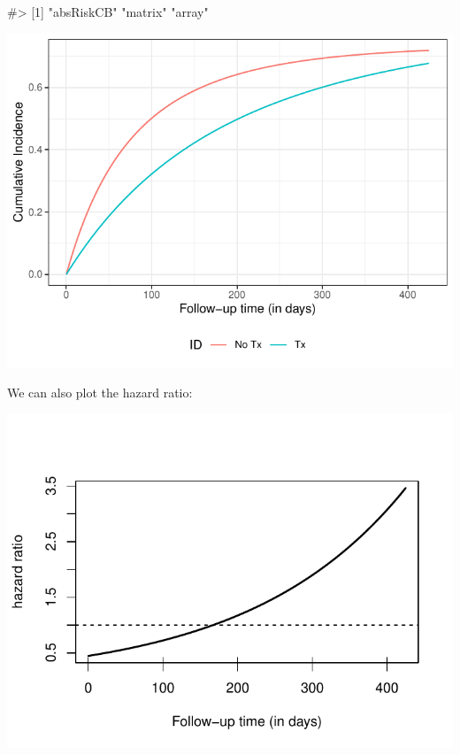\documentclass[
]{jss}
\begin{document}
\begin{CodeChunk}

\begin{CodeOutput}
#> [1] "absRiskCB" "matrix"    "array"
\end{CodeOutput}


\begin{center}\includegraphics{../figures/stanford-risk-1} \end{center}

\end{CodeChunk}

We can also plot the hazard ratio:

\begin{CodeChunk}


\begin{center}\includegraphics{../figures/unnamed-chunk-9-1} \end{center}

\end{CodeChunk}
\end{document}
